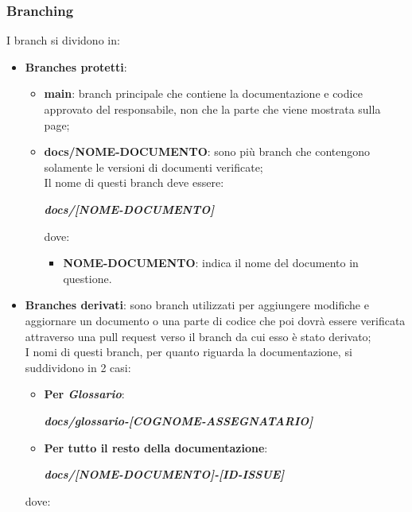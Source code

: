 \subsubsection{Branching}\label{inf:branch}
I branch si dividono in:
\begin{itemize}
      \item \textbf{Branches protetti}:
            \begin{itemize}
                  \item \textbf{main}: branch principale che contiene la documentazione e codice approvato del responsabile, non che la parte che viene mostrata sulla page;
                  \item \textbf{docs/NOME-DOCUMENTO}: sono più branch che contengono solamente le versioni di documenti verificate;\\
                        Il nome di questi branch deve essere:
                        \begin{center}
                              \textbf{\textit{docs/[NOME-DOCUMENTO]}}
                        \end{center}
                        dove:
                        \begin{itemize}
                              \item \textbf{NOME-DOCUMENTO}: indica il nome del documento in questione.
                        \end{itemize}
            \end{itemize}
      \item \textbf{Branches derivati}: sono branch utilizzati per aggiungere modifiche e aggiornare un documento o una parte di codice che poi dovrà essere verificata
            attraverso una pull request verso il branch da cui esso è stato derivato;\\
            I nomi di questi branch, per quanto riguarda la documentazione, si suddividono in 2 casi:
            \begin{itemize}
                  \item \textbf{Per \textit{Glossario}}:
                        \begin{center}
                              \textbf{\textit{docs/glossario-[COGNOME-ASSEGNATARIO]}}
                        \end{center}
                  \item \textbf{Per tutto il resto della documentazione}:
                        \begin{center}
                              \textbf{\textit{docs/[NOME-DOCUMENTO]-[ID-ISSUE]}}
                        \end{center}
            \end{itemize}
            dove:


\end{itemize}
